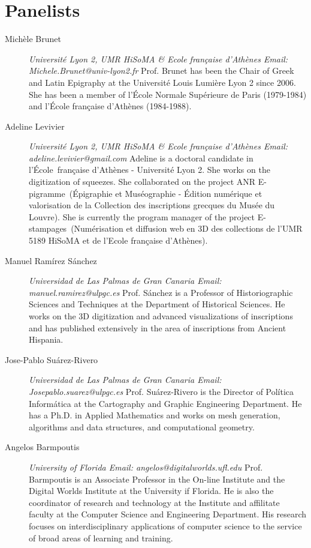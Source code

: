 \documentclass[amsthm,ebook]{saparticle}
\begin{document}
\section{Panelists}
\begin{description}
\item[Michèle Brunet]  \emph{Université Lyon 2, UMR HiSoMA \& Ecole française d’Athènes  Email: Michele.Brunet@univ-lyon2.fr} Prof. Brunet has been the Chair of Greek and Latin Epigraphy at the Université Louis Lumière Lyon 2 since 2006. She has been a member of l'École Normale Supérieure de Paris (1979-1984) and l'École française d'Athènes (1984-1988).

\item[Adeline Levivier] \emph{Université Lyon 2, UMR HiSoMA \& Ecole française d’Athènes Email: adeline.levivier@gmail.com} Adeline is a doctoral candidate in l’École française d'Athènes - Université Lyon 2. She works on the digitization of squeezes. She collaborated on the project ANR E-pigramme (Épigraphie et Muséographie - Édition numérique et valorisation de la Collection des inscriptions grecques du Musée du Louvre). She is currently the program manager of the project E-stampages (Numérisation et diffusion web en 3D des collections de l'UMR 5189 HiSoMA et de l'Ecole française d'Athènes).


\item[Manuel Ramírez Sánchez] \emph{Universidad de Las Palmas de Gran Canaria Email: manuel.ramirez@ulpgc.es} Prof. Sánchez is a Professor of Historiographic Sciences and Techniques at the Department of Historical Sciences. He works on the 3D digitization and advanced visualizations of inscriptions and has published extensively in the area of inscriptions from Ancient Hispania.

\item[Jose-Pablo Suárez-Rivero] \emph{Universidad de Las Palmas de Gran Canaria Email: Josepablo.suarez@ulpgc.es} Prof. Suárez-Rivero is the Director of Política Informática at the Cartography and Graphic Engineering Department. He has a Ph.D. in Applied Mathematics and works on mesh generation, algorithms and data structures, and computational geometry. 

\item[Angelos Barmpoutis] \emph{University of Florida Email: angelos@digitalworlds.ufl.edu} Prof. Barmpoutis is an Associate Professor in the On-line Institute and the Digital Worlds Institute at the University if Florida. He is also the coordinator of research and technology at the Institute and affilitate faculty at the Computer Science and Engineering Department. His research focuses on interdisciplinary applications of computer science to the service of broad areas of learning and training.  
\end{description}
\end{document}
